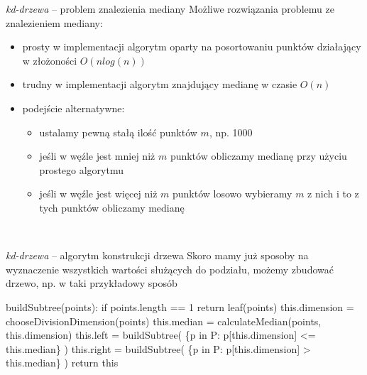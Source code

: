 \documentclass{beamer}
\begin{document}
\begin{frame}{\textit{kd-drzewa} -- problem znalezienia mediany}
    Możliwe rozwiązania problemu ze znalezieniem mediany:
    \begin{itemize}
        \item<2-> prosty w implementacji algorytm oparty na posortowaniu punktów działający w złożoności $O(nlog(n))$
        \item<3-> trudny w implementacji algorytm znajdujący medianę w czasie $O(n)$
        \item<4-> podejście alternatywne:
        \begin{itemize}
            \item<5-> ustalamy pewną stałą ilość punktów $m$, np. 1000
            \item<5-> jeśli w węźle jest mniej niż $m$ punktów obliczamy medianę przy użyciu prostego algorytmu
            \item<5-> jeśli w węźle jest więcej niż $m$ punktów losowo wybieramy $m$ z nich i to z tych punktów obliczamy medianę
        \end{itemize}
    \end{itemize}
    \\
\end{frame}

\begin{frame}[fragile]{\textit{kd-drzewa} -- algorytm konstrukcji drzewa}
    Skoro mamy już sposoby na wyznaczenie wszystkich wartości służących do podziału, możemy zbudować drzewo, np. w taki przykładowy sposób
    \pause
    \begin{semiverbatim}
    buildSubtree(points):
        if points.length == 1
            return leaf(points)
        this.dimension = chooseDivisionDimension(points)
        this.median = calculateMedian(points, this.dimension)
        this.left = buildSubtree(
            \{p in P: p[this.dimension] <= this.median\}
        )
        this.right = buildSubtree(
            \{p in P: p[this.dimension] > this.median\}
        )
        return this
    \end{semiverbatim}
\end{frame}
\end{document}
